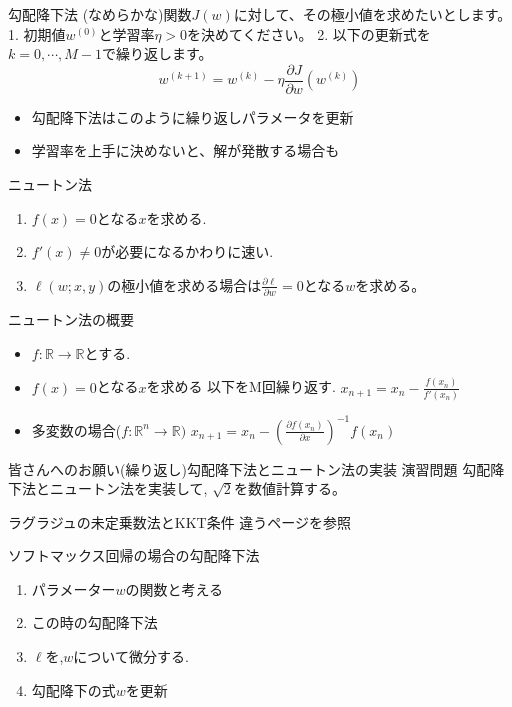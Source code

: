 \begin{frame}{勾配降下法}
(なめらかな)関数$J(w)$に対して、その極小値を求めたいとします。
1. 初期値$w^{(0)}$と学習率$\eta>0$を決めてください。
2. 以下の更新式を$k=0,\cdots, M-1$で繰り返します。
$$
w^{(k+1)}=w^{(k)}-\eta\frac{\partial J}{\partial w}(w^{(k)})
$$

\begin{itemize}
\item 勾配降下法はこのように繰り返しパラメータを更新
\item 学習率を上手に決めないと、解が発散する場合も
\end{itemize}
\end{frame}

\begin{frame}{ニュートン法}
\begin{enumerate}
\item $f(x) = 0$となる$x$を求める.
\item $f'(x) \neq 0$が必要になるかわりに速い.
\item $\ell(w; x, y)$の極小値を求める場合は$\frac{\partial \ell}{\partial w} = 0$となる$w$を求める。
\end{enumerate}
\end{frame}

\begin{frame}{ニュートン法の概要}
\begin{itemize}
\item $f: \mathbb{R} \to \mathbb{R}$とする.
\item $f(x) = 0$となる$x$を求める
以下をM回繰り返す.
  $x_{n+1} = x_n - \frac{f(x_n)}{f'(x_{n})}$
\item 多変数の場合($f: \mathbb{R}^n  \to \mathbb{R})$
  $x_{n+1} = x_n - \left(\frac{\partial f(x_{n})}{\partial x} \right)^{-1} f(x_n)$
\end{itemize}
\end{frame}

\begin{frame}{皆さんへのお願い(繰り返し)}勾配降下法とニュートン法の実装
演習問題
勾配降下法とニュートン法を実装して,
$\sqrt{2}$を数値計算する。
\end{frame}

\begin{frame}{ラグラジュの未定乗数法とKKT条件}
違うページを参照
\end{frame}

\begin{frame}{ソフトマックス回帰の場合の勾配降下法}
\begin{enumerate}
\item パラメーター$w$の関数と考える
\item この時の勾配降下法
  \item $\ell$を,$w$について微分する.
  \item 勾配降下の式$w$を更新
\end{enumerate}
\end{frame}

